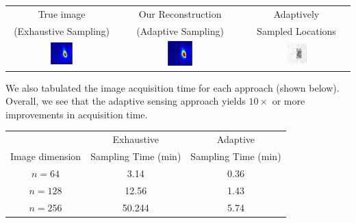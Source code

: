 \documentclass[landscape,final,a0paper,fontscale=0.33]{baposter}
\begin{document}
\begin{poster}
{{        \begin{center}
        \begin{tabular}{ccc}
            True image & Our Reconstruction &  Adaptively \\
            (Exhaustive Sampling) & (Adaptive Sampling) & Sampled Locations \\
        \includegraphics[width=0.21\textwidth]{figures/results/thermal/2014-09-09thermal_x}&
        \includegraphics[width=0.21\textwidth]{figures/results/thermal/2014-09-09thermal_xhat}&
        \includegraphics[width=0.21\textwidth]{figures/python_scripting/thermal_sampleAt}\\
        \end{tabular}
        \end{center}

\noindent We also tabulated the image acquisition time for each approach (shown below).  Overall, we see that the adaptive sensing approach yields $10\times$ or more improvements in acquisition time.

        \begin{center}
        \begin{tabular}{c|cc}
             & Exhaustive & Adaptive\\
            Image dimension  & Sampling Time (min) & Sampling Time (min)\\
            \hline
            $n=64$ & 3.14 & 0.36 \\
            $n=128$ &  12.56 & 1.43 \\
            $n=256$ & 50.244 & 5.74 \\


\end{tabular}
\end{center}}}
\end{poster}
\end{document}
